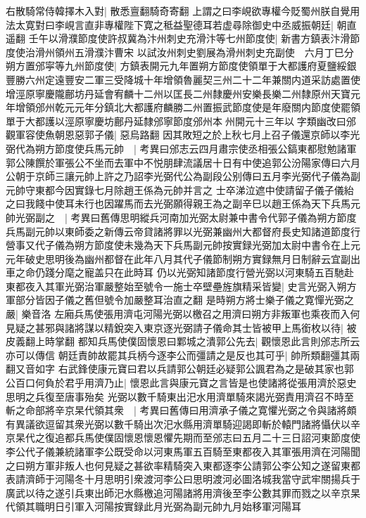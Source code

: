 右散騎常侍韓擇木入對|{
	散悉亶翻騎奇寄翻}
上謂之曰李峴欲專權今貶蜀州朕自覺用法太寛對曰李峴言直非專權陛下寛之秪益聖德耳若虚尋除御史中丞威振朝廷|{
	朝直遥翻}
壬午以滑濮節度使許叔冀為汴州刺史充滑汴等七州節度使|{
	新書方鎮表汴滑節度使治滑州領州五滑濮汴曹宋}
以試汝州刺史劉展為滑州刺史充副使　六月丁巳分朔方置邠寜等九州節度使|{
	方鎮表開元九年置朔方節度使領單于大都護府夏鹽綏銀豐勝六州定遠豐安二軍三受降城十年增領魯麗契三州二十二年兼關内道采訪處置使增涇原寧慶隴鄜坊丹延會宥麟十二州以匡長二州隸慶州安樂長樂二州隸原州天寶元年增領邠州乾元元年分鎮北大都護府麟勝二州置振武節度使是年廢關内節度使罷領單于大都護以涇原寧慶坊鄜丹延隸邠寧節度邠州本州開元十三年以字類幽改曰邠}
觀軍容使魚朝恩惡郭子儀|{
	惡烏路翻}
因其敗短之於上秋七月上召子儀還京師以李光弼代為朔方節度使兵馬元帥　|{
	考異曰邠志云四月肅宗使丞相張公鎬東都慰勉諸軍郭公陳饌於軍張公不坐而去軍中不悦朋肆流議居十日有中使追郭公汾陽家傳曰六月公朝于京師三讓元帥上許之乃詔李光弼代公為副段公别傳曰五月李光弼代子儀為副元帥守東都今因實錄七月除趙王係為元帥并言之}
士卒涕泣遮中使請留子儀子儀紿之曰我餞中使耳未行也因躍馬而去光弼願得親王為之副辛巳以趙王係為天下兵馬元帥光弼副之　|{
	考異曰舊傳思明縱兵河南加光弼太尉兼中書令代郭子儀為朔方節度兵馬副元帥以東師委之新傳云帝貸諸將罪以光弼兼幽州大都督府長史知諸道節度行營事又代子儀為朔方節度使未幾為天下兵馬副元帥按實録光弼加太尉中書令在上元元年破史思明後為幽州都督在此年八月其代子儀節制朔方實録無月日制辭云宜副出車之命仍踐分麾之寵盖只在此時耳}
仍以光弼知諸節度行營光弼以河東騎五百馳赴東都夜入其軍光弼治軍嚴整始至號令一施士卒壁壘旌旗精采皆變|{
	史言光弼入朔方軍部分皆因子儀之舊但號令加嚴整耳治直之翻}
是時朔方將士樂子儀之寛憚光弼之嚴|{
	樂音洛}
左廂兵馬使張用濟屯河陽光弼以檄召之用濟曰朔方非叛軍也乘夜而入何見疑之甚邪與諸將謀以精銳突入東京逐光弼請子儀命其士皆被甲上馬銜枚以待|{
	被皮義翻上時掌翻}
都知兵馬使僕固懷恩曰鄴城之潰郭公先去|{
	觀懷恩此言則邠志所云亦可以傳信}
朝廷責帥故罷其兵柄今逐李公而彊請之是反也其可乎|{
	帥所類翻彊其兩翻又音如字}
右武鋒使康元寶曰君以兵請郭公朝廷必疑郭公諷君為之是破其家也郭公百口何負於君乎用濟乃止|{
	懷恩此言與康元寶之言皆是也使諸將從張用濟於惡史思明之兵復至唐事殆矣}
光弼以數千騎東出汜水用濟單騎來謁光弼責用濟召不時至斬之命部將辛京杲代領其衆　|{
	考異曰舊傳曰用濟承子儀之寛懼光弼之令與諸將頗有異議欲逗留其衆光弼以數千騎出次汜水縣用濟單騎迎謁即斬於轅門諸將懾伏以辛京杲代之復追都兵馬使僕固懷恩懷恩懼先期而至邠志曰五月二十三日詔河東節度使李公代子儀兼統諸軍李公既受命以河東馬軍五百騎至東都夜入其軍張用濟在河陽聞之曰朔方軍非叛人也何見疑之甚欲率精騎突入東都逐李公請郭公李公知之遂留東都表請濟師于河陽冬十月思明引衆渡河李公曰思明渡河必圖洛城我當守武牢關揚兵于廣武以待之遂引兵東出師汜水縣檄追河陽諸將用濟後至李公數其罪而戮之以辛京杲代領其職明日引軍入河陽按實録此月光弼為副元帥九月始移軍河陽耳}
